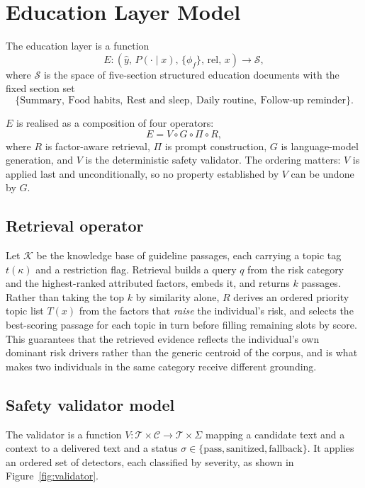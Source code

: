 \section{Education Layer Model}
\label{sec:education_model}

The education layer is a function
\begin{equation}
E : (\hat{y},\, P(\cdot \mid x),\, \{\phi_f\},\, \mathrm{rel},\, x) \longrightarrow
\mathcal{S},
\end{equation}
where $\mathcal{S}$ is the space of five-section structured education documents
with the fixed section set
\[
\{\text{Summary},\ \text{Food habits},\ \text{Rest and sleep},\
\text{Daily routine},\ \text{Follow-up reminder}\}.
\]

$E$ is realised as a composition of four operators:
\begin{equation}
E = V \circ G \circ \Pi \circ R,
\label{eq:composition}
\end{equation}
where $R$ is factor-aware retrieval, $\Pi$ is prompt construction, $G$ is
language-model generation, and $V$ is the deterministic safety validator. The
ordering matters: $V$ is applied last and unconditionally, so no property
established by $V$ can be undone by $G$.

\subsection{Retrieval operator}

Let $\mathcal{K}$ be the knowledge base of guideline passages, each carrying a
topic tag $t(\kappa)$ and a restriction flag. Retrieval builds a query $q$ from
the risk category and the highest-ranked attributed factors, embeds it, and
returns $k$ passages. Rather than taking the top $k$ by similarity alone,
$R$ derives an ordered priority topic list $T(x)$ from the factors that
\emph{raise} the individual's risk, and selects the best-scoring passage for
each topic in turn before filling remaining slots by score. This guarantees that
the retrieved evidence reflects the individual's own dominant risk drivers
rather than the generic centroid of the corpus, and is what makes two
individuals in the same category receive different grounding.

\subsection{Safety validator model}

The validator is a function $V : \mathcal{T} \times \mathcal{C} \rightarrow
\mathcal{T} \times \Sigma$ mapping a candidate text and a context to a delivered
text and a status $\sigma \in \{\text{pass}, \text{sanitized}, \text{fallback}\}$.
It applies an ordered set of detectors, each classified by severity, as shown in
Figure~\ref{fig:validator}.

